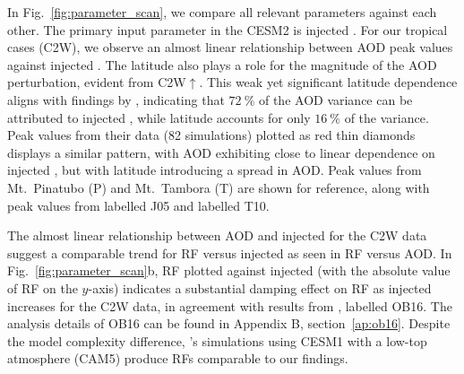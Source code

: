 \documentclass[draft]{agujournal2019}
\newcommand{\iso}[1][i]{{#1}njected \ce{SO2}}
\newcommand{\cwsn}{C2W\(\uparrow\)}
\begin{document}
In Fig.~\ref{fig:parameter_scan}, we compare all relevant parameters against each other.
The primary input parameter in the CESM2 is \iso{}. For our tropical cases (C2W), we
observe an almost linear relationship between AOD peak values against \iso{}. The
latitude also plays a role for the magnitude of the AOD perturbation, evident from
\cwsn{}. This weak yet significant latitude dependence aligns with findings by
, indicating that \(\SI{72}{\percent}\) of the AOD variance can be
attributed to \iso{}, while latitude accounts for only \(\SI{16}{\percent}\) of the
variance. Peak values from their data (82 simulations) plotted as red thin diamonds
displays a similar pattern, with AOD exhibiting close to linear dependence on \iso{},
but with latitude introducing a spread in AOD. Peak values from Mt.\ Pinatubo (P) and
Mt.\ Tambora (T) are shown for reference, along with peak values from 
labelled J05 and  labelled T10.

The almost linear relationship between AOD and \iso{} for the C2W data suggest a
comparable trend for RF versus \iso{} as seen in RF versus AOD. In
Fig.~\ref{fig:parameter_scan}b, RF plotted against \iso{} (with the absolute value of RF
on the \(y\)-axis) indicates a substantial damping effect on RF as \iso{} increases for
the C2W data, in agreement with results from , labelled OB16.
The analysis details of OB16 can be found in Appendix B, section~\ref{ap:ob16}. Despite
the model complexity difference, 's simulations using CESM1 with
a low-top atmosphere (CAM5) produce RFs comparable to our findings.
\end{document}
